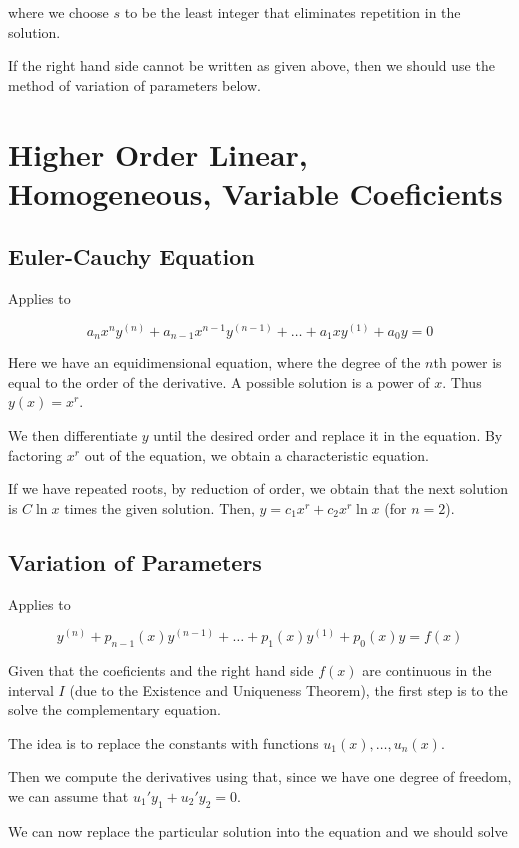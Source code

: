 \documentclass[12pt,a4paper]{article}
\begin{document}
where we choose $s$ to be the least integer that eliminates repetition in the solution.

If the right hand side cannot be written as given above, then we should use the method of variation of parameters below.

\section{Higher Order Linear, Homogeneous, Variable Coeficients}\label{higher-order-linear-homogeneous-variable-coeficients}

\subsection{Euler-Cauchy Equation}

Applies to

\[
a_nx^ny^{(n)} + a_{n-1}x^{n-1}y^{(n-1)}+\ldots+a_1xy^{(1)}+a_0y=0
\]

Here we have an equidimensional equation, where the degree of the $n$th power is equal to the order of the derivative. A possible solution is a power of $x$. Thus $y(x)=x^r$.

We then differentiate $y$ until the desired order and replace it in the equation. By factoring $x^r$ out of the equation, we obtain a characteristic equation. 

If we have repeated roots, by reduction of order, we obtain that the next solution is $C \ln x$ times the given solution. Then, $y = c_1 x^r + c_2 x^r \ln x$ (for $n=2$).

\subsection{Variation of Parameters}

Applies to

\[
y^{(n)}+p_{n-1}(x)y^{(n-1)}+\ldots+p_1(x)y^{(1)}+p_0(x)y=f(x)
\]

Given that the coeficients and the right hand side $f(x)$ are continuous in the interval $I$ (due to the Existence and Uniqueness Theorem), the first step is to the solve the complementary equation.

The idea is to replace the constants with functions $u_1(x), \ldots, u_n(x)$. 

Then we compute the derivatives using that, since we have one degree of freedom, we can assume that $u_1'y_1+u_2'y_2=0$. 

We can now replace the particular solution into the equation and we should solve
\end{document}
